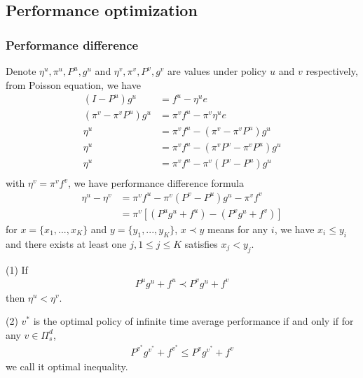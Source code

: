 \documentclass[runningheads]{llncs}
\begin{document}
    \subsection{Performance optimization}
    \subsubsection{Performance difference}
    Denote $\eta^u, \pi^u, P^u, g^u$ and $\eta^v, \pi^v, P^v, g^v$
    are values under policy $u$ and $v$ respectively,
    from Poisson equation, we have
    \begin{align}
        (I - P^u)g^u &= f^u - \eta^u e \\
        (\pi^v - \pi^vP^u)g^u &= \pi^v f^u - \pi^v\eta^u e \\
        \eta^u &= \pi^v f^u - (\pi^v - \pi^vP^u)g^u \\
        \eta^u &= \pi^v f^u - (\pi^v P^v - \pi^vP^u)g^u \\
        \eta^u &= \pi^v f^u - \pi^v (P^v - P^u)g^u \\
    \end{align} 
    with $\eta^v = \pi^v f^v$, we have performance difference formula
    \begin{align}
        \eta^u - \eta^v &= \pi^v f^u - \pi^v (P^v - P^u)g^u - \pi^v f^v \\
        &= \pi^v [(P^u g^u + f^u) - (P^v g^u + f^v)]
    \end{align}
    for $x = \{ x_1,...,x_K \}$ and $y = \{ y_1,...,y_K \}$, $x \prec y$
    means for any $i$, we have $x_i \leq y_i$ and there exists at least one
    $j, 1 \leq j \leq K$ satisfies $x_j < y_j$.
    \begin{lemma}
    (1) If
    \begin{align}
        P^ug^u + f^u \prec P^vg^u + f^v
    \end{align}
    then $\eta^u < \eta^v$.
    \par
    (2) $v^*$ is the optimal policy of infinite time average performance
    if and only if for any $v \in \Pi_s^d$,
    \begin{align}
        P^{v^*}g^{v^*} + f^{v^*} \leq P^vg^{v^*} + f^v
    \end{align}
    we call it optimal inequality.
    \end{lemma}
\end{document}
